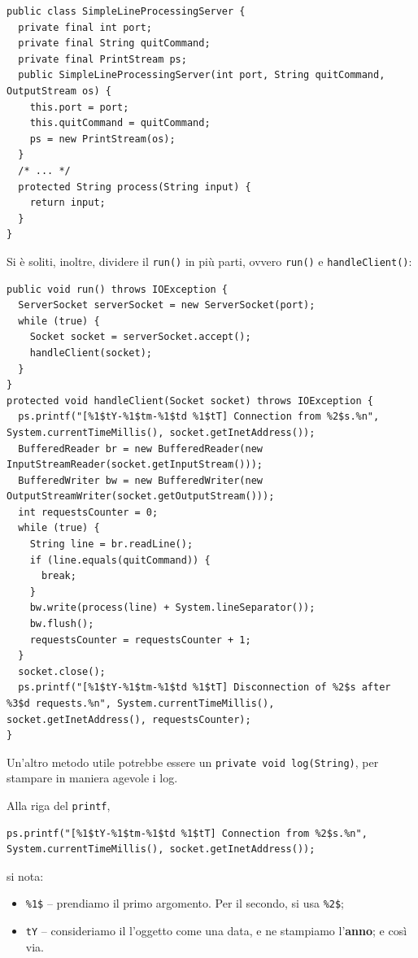 \documentclass[\fontsizeclass,twocolumn]{\classname}
\theoremstyle{definition}
\theoremstyle{definition}
\begin{document}
\begin{lstlisting}
public class SimpleLineProcessingServer {
  private final int port;
  private final String quitCommand;
  private final PrintStream ps;
  public SimpleLineProcessingServer(int port, String quitCommand, OutputStream os) {
    this.port = port;
    this.quitCommand = quitCommand;
    ps = new PrintStream(os);
  }
  /* ... */
  protected String process(String input) {
    return input;
  }
}
\end{lstlisting}

Si è soliti, inoltre, dividere il \texttt{run()} in più parti, ovvero
\texttt{run()} e \texttt{handleClient()}:

\begin{lstlisting}
public void run() throws IOException {
  ServerSocket serverSocket = new ServerSocket(port);
  while (true) {
    Socket socket = serverSocket.accept();
    handleClient(socket);
  }
}
protected void handleClient(Socket socket) throws IOException {
  ps.printf("[%1$tY-%1$tm-%1$td %1$tT] Connection from %2$s.%n", System.currentTimeMillis(), socket.getInetAddress());
  BufferedReader br = new BufferedReader(new InputStreamReader(socket.getInputStream()));
  BufferedWriter bw = new BufferedWriter(new OutputStreamWriter(socket.getOutputStream()));
  int requestsCounter = 0;
  while (true) {
    String line = br.readLine();
    if (line.equals(quitCommand)) {
      break;
    }
    bw.write(process(line) + System.lineSeparator());
    bw.flush();
    requestsCounter = requestsCounter + 1;
  }
  socket.close();
  ps.printf("[%1$tY-%1$tm-%1$td %1$tT] Disconnection of %2$s after %3$d requests.%n", System.currentTimeMillis(), socket.getInetAddress(), requestsCounter);
}
\end{lstlisting}

Un'altro metodo utile potrebbe essere un \texttt{private void log(String)}, per
stampare in maniera agevole i log.

Alla riga del \texttt{printf},


\begin{lstlisting}
ps.printf("[%1$tY-%1$tm-%1$td %1$tT] Connection from %2$s.%n", System.currentTimeMillis(), socket.getInetAddress());
\end{lstlisting}

si nota:
\begin{itemize}
    \item \texttt{\%1\$} -- prendiamo il primo argomento. Per il secondo, si
        usa \texttt{\%2\$};
    \item \texttt{tY} -- consideriamo il l'oggetto come una data, e ne
        stampiamo l'\textbf{anno}; e così via.
\end{itemize}
\end{document}
